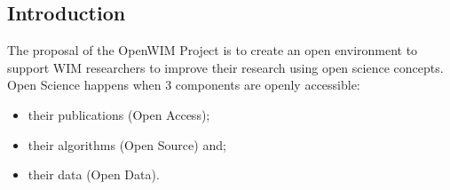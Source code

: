 \documentclass[a0,portrait]{a0poster}
\begin{document}
\begin{multicols}{2} %


%
%


\color{black} %
\Large

\section*{Introduction}

The proposal of the OpenWIM Project is to create an open environment to support WIM researchers to improve their research using open science concepts.\\

Open Science happens when 3 components are openly accessible:

\begin{itemize}
\item their publications (Open Access);
\item their algorithms (Open Source) and;
\item their data (Open Data).
\end{itemize}
\hfill


\end{multicols}
\end{document}
